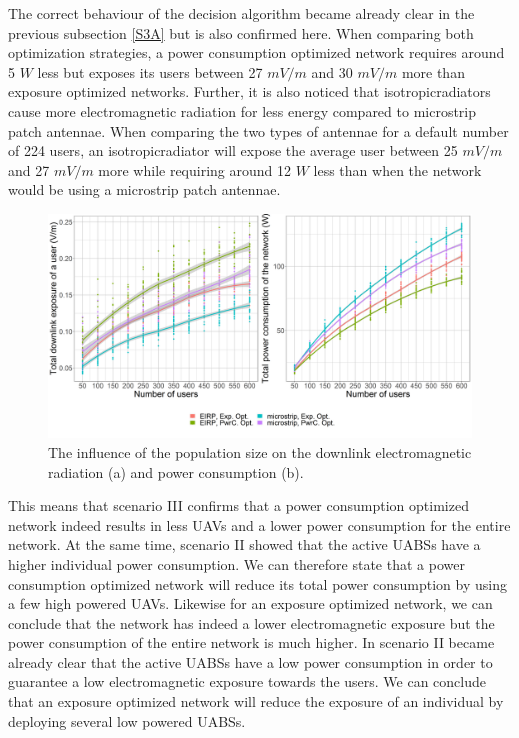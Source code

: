 The correct behaviour of the decision algorithm became already clear in the previous subsection \ref{S3A} but is also
confirmed here. 
When comparing both optimization strategies, a power consumption optimized network requires around 5 $W$ less but exposes its users between 27 $mV/m$ and 30 $mV/m$ more than
exposure optimized networks. 
Further, it is also noticed that \gls{isotropicradiator}s cause more electromagnetic radiation for less energy
compared to microstrip patch antennae. 
When comparing the two types of antennae for a default number of 224 users, 
an \gls{isotropicradiator} will expose the average user 
between 25 $mV/m$ and 27 $mV/m$ more while requiring around 12 $W$ less than when the network would be using a microstrip patch antennae.


\begin{figure}[h!]
  \includegraphics[width=\textwidth]{../results/s3/uvsdlAndPc.png}
  \caption{The influence of the population size on the downlink electromagnetic radiation (a) and power consumption (b).}
  \label{fig:s3b_dlAndPC}
\end{figure}
This means that scenario III confirms that a power consumption optimized network indeed results in less \gls{UAV}s and a lower 
 power consumption for the entire network. 
At the same time, scenario II showed that the active \gls{UABS}s have a higher individual power consumption.
We can therefore state that a power consumption optimized network will reduce its total power consumption by
using a few high powered \gls{UAV}s.
Likewise for an exposure optimized network, we can conclude that the network has indeed a lower electromagnetic exposure but the power consumption 
of the entire network is much higher. In scenario II became already clear that the active \gls{UABS}s have a low power consumption in order to 
guarantee a low electromagnetic exposure towards the users.
We can conclude that an exposure optimized network will reduce the exposure of an individual 
by deploying several low powered \gls{UABS}s.


